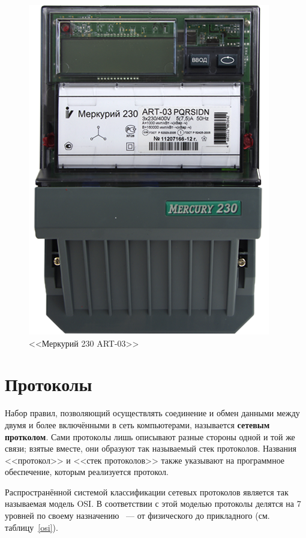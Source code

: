 \begin{figure}[h]
	\label{mercury}
	\centering
		\includegraphics[scale=0.6]{img/mercury.png}
	\caption{<<Меркурий 230 ART-03>>}
\end{figure}

\fi

\newpage

\section{Протоколы}

Набор правил, позволяющий осуществлять соединение и обмен данными между двумя и более включёнными в сеть компьютерами, называется \textbf{сетевым протколом}.
Сами протоколы лишь описывают разные стороны одной и той же связи; взятые вместе, они образуют так называемый стек протоколов. Названия <<протокол>> и <<стек протоколов>> также указывают на программное обеспечение, которым реализуется протокол\cite{protocols}.

Распространённой системой классификации сетевых протоколов является так называемая модель OSI. В соответствии с этой моделью протоколы делятся на 7 уровней по своему назначению ~--- от физического до прикладного (см. таблицу~\ref{osi}). 

